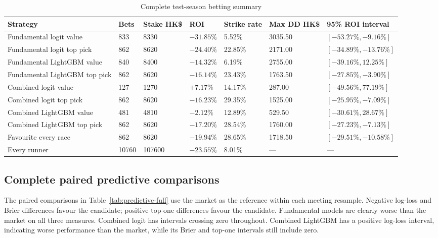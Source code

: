 \begin{table}[htbp]
\centering
\caption{Complete test-season betting summary}\label{tab:betting-full}
\scriptsize
\setlength{\tabcolsep}{3.2pt}
\begin{tabular}{L{4.2cm} R{1.0cm} R{1.5cm} R{1.4cm} R{1.5cm} R{1.6cm} L{3.0cm}}
\toprule
\textbf{Strategy} & \textbf{Bets} & \textbf{Stake HK\$} & \textbf{ROI} & \textbf{Strike rate} & \textbf{Max DD HK\$} & \textbf{95\% ROI interval} \\
\midrule
Fundamental logit value & 833 & \num{8330} & $-31.85\%$ & 5.52\% & \num{3035.50} & $[-53.27\%,-9.16\%]$ \\
Fundamental logit top pick & 862 & \num{8620} & $-24.40\%$ & 22.85\% & \num{2171.00} & $[-34.89\%,-13.76\%]$ \\
Fundamental LightGBM value & 840 & \num{8400} & $-14.32\%$ & 6.19\% & \num{2755.00} & $[-39.16\%,12.25\%]$ \\
Fundamental LightGBM top pick & 862 & \num{8620} & $-16.14\%$ & 23.43\% & \num{1763.50} & $[-27.85\%,-3.90\%]$ \\
Combined logit value & 127 & \num{1270} & $+7.17\%$ & 14.17\% & 287.00 & $[-49.56\%,77.19\%]$ \\
Combined logit top pick & 862 & \num{8620} & $-16.23\%$ & 29.35\% & \num{1525.00} & $[-25.95\%,-7.09\%]$ \\
Combined LightGBM value & 481 & \num{4810} & $-2.12\%$ & 12.89\% & 529.50 & $[-30.61\%,28.67\%]$ \\
Combined LightGBM top pick & 862 & \num{8620} & $-17.20\%$ & 28.54\% & \num{1760.00} & $[-27.23\%,-7.13\%]$ \\
Favourite every race & 862 & \num{8620} & $-19.94\%$ & 28.65\% & \num{1718.50} & $[-29.51\%,-10.58\%]$ \\
Every runner & \num{10760} & \num{107600} & $-23.55\%$ & 8.01\% & --- & --- \\
\bottomrule
\end{tabular}
\end{table}

\subsection{Complete paired predictive comparisons}\label{app:predictive-intervals}
The paired comparisons in Table~\ref{tab:predictive-full} use the market as the reference within each meeting resample. Negative log-loss and Brier differences favour the candidate; positive top-one differences favour the candidate. Fundamental models are clearly worse than the market on all three measures. Combined logit has intervals crossing zero throughout. Combined LightGBM has a positive log-loss interval, indicating worse performance than the market, while its Brier and top-one intervals still include zero.

